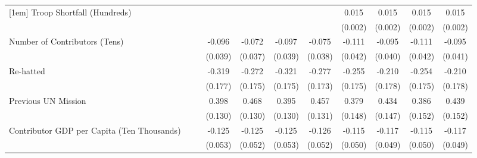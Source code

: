 \begin{table}[htbp]
\begin{tabular}{l*{10}{c}}
[1em]
Troop Shortfall (Hundreds)&                    &                    &                    &                    &                    &                    &       0.015\sym{**}&       0.015\sym{**}&       0.015\sym{**}&       0.015\sym{**}\\
                    &                    &                    &                    &                    &                    &                    &     (0.002)        &     (0.002)        &     (0.002)        &     (0.002)        \\
[1em]
Number of Contributors (Tens)&                    &                    &      -0.096\sym{*} &      -0.072\sym{+} &      -0.097\sym{*} &      -0.075\sym{+} &      -0.111\sym{**}&      -0.095\sym{*} &      -0.111\sym{**}&      -0.095\sym{*} \\
                    &                    &                    &     (0.039)        &     (0.037)        &     (0.039)        &     (0.038)        &     (0.042)        &     (0.040)        &     (0.042)        &     (0.041)        \\
[1em]
Re-hatted           &                    &                    &      -0.319\sym{+} &      -0.272        &      -0.321\sym{+} &      -0.277        &      -0.255        &      -0.210        &      -0.254        &      -0.210        \\
                    &                    &                    &     (0.177)        &     (0.175)        &     (0.175)        &     (0.173)        &     (0.175)        &     (0.178)        &     (0.175)        &     (0.178)        \\
[1em]
Previous UN Mission &                    &                    &       0.398\sym{**}&       0.468\sym{**}&       0.395\sym{**}&       0.457\sym{**}&       0.379\sym{*} &       0.434\sym{**}&       0.386\sym{*} &       0.439\sym{**}\\
                    &                    &                    &     (0.130)        &     (0.130)        &     (0.130)        &     (0.131)        &     (0.148)        &     (0.147)        &     (0.152)        &     (0.152)        \\
[1em]
Contributor GDP per Capita (Ten Thousands)&                    &                    &      -0.125\sym{*} &      -0.125\sym{*} &      -0.125\sym{*} &      -0.126\sym{*} &      -0.115\sym{*} &      -0.117\sym{*} &      -0.115\sym{*} &      -0.117\sym{*} \\
                    &                    &                    &     (0.053)        &     (0.052)        &     (0.053)        &     (0.052)        &     (0.050)        &     (0.049)        &     (0.050)        &     (0.049)        \\

\end{tabular}
\end{table}
